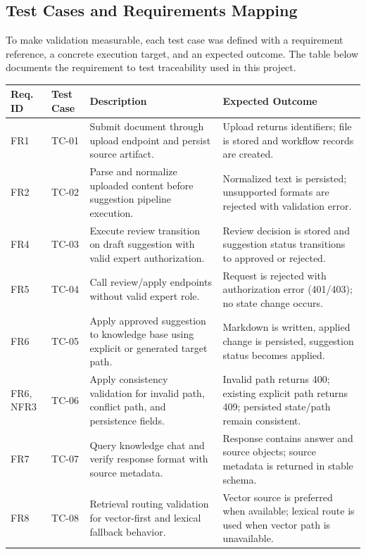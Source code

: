 \subsection{Test Cases and Requirements Mapping}

To make validation measurable, each test case was defined with a requirement reference, a concrete execution target, and an expected outcome. The table below documents the requirement to test traceability used in this project.

\begin{table}[H]
\centering
\small
\begin{tabular}{p{1.5cm} p{1.5cm} p{6.4cm} p{5.5cm}}
\textbf{Req. ID} & \textbf{Test Case} & \textbf{Description} & \textbf{Expected Outcome} \\
\hline
FR1 & TC-01 & Submit document through upload endpoint and persist source artifact. & Upload returns identifiers; file is stored and workflow records are created. \\
\hline
FR2 & TC-02 & Parse and normalize uploaded content before suggestion pipeline execution. & Normalized text is persisted; unsupported formats are rejected with validation error. \\
\hline
FR4 & TC-03 & Execute review transition on draft suggestion with valid expert authorization. & Review decision is stored and suggestion status transitions to approved or rejected. \\
\hline
FR5 & TC-04 & Call review/apply endpoints without valid expert role. & Request is rejected with authorization error (401/403); no state change occurs. \\
\hline
FR6 & TC-05 & Apply approved suggestion to knowledge base using explicit or generated target path. & Markdown is written, applied change is persisted, suggestion status becomes applied. \\
\hline
FR6, NFR3 & TC-06 & Apply consistency validation for invalid path, conflict path, and persistence fields. & Invalid path returns 400; existing explicit path returns 409; persisted state/path remain consistent. \\
\hline
FR7 & TC-07 & Query knowledge chat and verify response format with source metadata. & Response contains answer and source objects; source metadata is returned in stable schema. \\
\hline
FR8 & TC-08 & Retrieval routing validation for vector-first and lexical fallback behavior. & Vector source is preferred when available; lexical route is used when vector path is unavailable. \\

\end{tabular}
\end{table}
